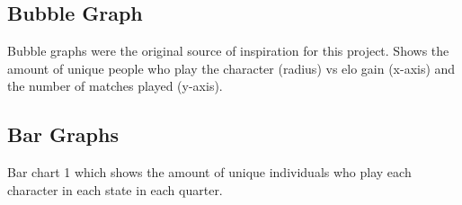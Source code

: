 \documentclass[11pt, oneside, a4paper]{article}
\begin{document}
\subsection*{Bubble Graph}
{%
\setlength{\fboxsep}{0pt}%
\setlength{\fboxrule}{1pt}%
%

Bubble graphs were the original source of inspiration for this project. Shows the amount of unique people who play the character (radius) vs elo gain (x-axis) and the number of matches played (y-axis).

\subsection*{Bar Graphs}
{%
\setlength{\fboxsep}{0pt}%
\setlength{\fboxrule}{1pt}%
%

Bar chart 1 which shows the amount of unique individuals who play each character in each state in each quarter.

}}
\end{document}
